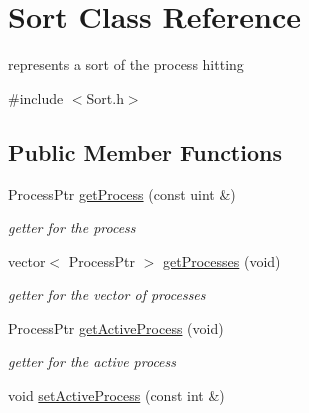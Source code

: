 \hypertarget{class_sort}{\section{\-Sort \-Class \-Reference}
\label{class_sort}
}


represents a sort of the process hitting  




{\ttfamily \#include $<$\-Sort.\-h$>$}

\subsection*{\-Public \-Member \-Functions}
\begin{DoxyCompactItemize}
\item 
\hypertarget{class_sort_a5b30c6e6f75987a8a10bef36762aace6}{\-Process\-Ptr \hyperlink{class_sort_a5b30c6e6f75987a8a10bef36762aace6}{get\-Process} (const uint \&)}\label{class_sort_a5b30c6e6f75987a8a10bef36762aace6}

\begin{DoxyCompactList}\small\item\em getter for the process \end{DoxyCompactList}\item 
\hypertarget{class_sort_a1b76cf03a033bdee33ddd783e6e61f29}{vector$<$ \-Process\-Ptr $>$ \hyperlink{class_sort_a1b76cf03a033bdee33ddd783e6e61f29}{get\-Processes} (void)}\label{class_sort_a1b76cf03a033bdee33ddd783e6e61f29}

\begin{DoxyCompactList}\small\item\em getter for the vector of processes \end{DoxyCompactList}\item 
\hypertarget{class_sort_ad77072a25565d843de3ea6a7b47ffbdd}{\-Process\-Ptr \hyperlink{class_sort_ad77072a25565d843de3ea6a7b47ffbdd}{get\-Active\-Process} (void)}\label{class_sort_ad77072a25565d843de3ea6a7b47ffbdd}

\begin{DoxyCompactList}\small\item\em getter for the active process \end{DoxyCompactList}\item 
\hypertarget{class_sort_afb60d6f4e0b2d2984faf33fe16ad29b2}{void \hyperlink{class_sort_afb60d6f4e0b2d2984faf33fe16ad29b2}{set\-Active\-Process} (const int \&)}\label{class_sort_afb60d6f4e0b2d2984faf33fe16ad29b2}


\end{DoxyCompactItemize}
